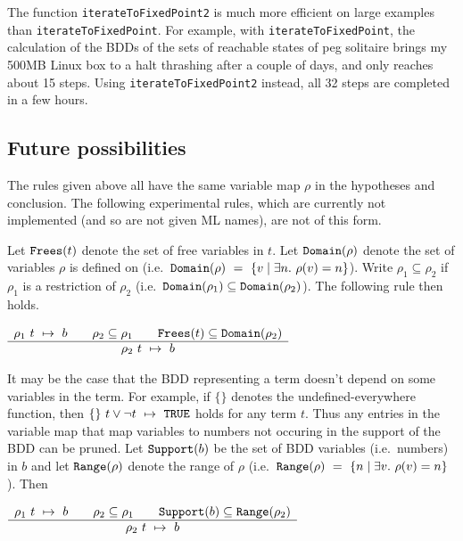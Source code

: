 \documentclass[12pt]{article}
\newcommand{\ml}[1]{{\tt #1}}
\newcommand{\termbdd}[3]{\mbox{$#1~#2~\mapsto~#3$}}
\begin{document}
The function \ml{iterateToFixedPoint2} is much more efficient on large
examples than \ml{iterateToFixedPoint}. For example, with
\ml{iterateToFixedPoint}, the calculation of the BDDs of the sets of
reachable states of peg solitaire brings my 500MB Linux box to a halt
thrashing after a couple of days, and only reaches about 15 steps.
Using \ml{iterateToFixedPoint2} instead, all 32 steps are completed in a few
hours.

\subsection{Future possibilities}\label{future}

The rules given above all have the same variable map $\rho$ in the
hypotheses and conclusion. The following experimental rules, which are currently
not implemented (and so are not given ML names), are not of this form.

Let $\ml{Frees}(t)$ denote the set of free variables in $t$.  
Let 
$\ml{Domain}(\rho)$ denote the set of variables $\rho$ is defined on
(i.e.~$\ml{Domain}(\rho)~=~\{v\mid \exists n.~\rho(v)=n\}$).
Write
$\rho_1\subseteq\rho_2$ if $\rho_1$ is a restriction of $\rho_2$
(i.e.~$\ml{Domain}(\rho_1)\subseteq\ml{Domain}(\rho_2)$).  
The following rule then holds.

\smallskip


$\begin{array}{c}
\termbdd{\rho_1}{t}{b} \qquad \rho_2\subseteq\rho_1 \qquad \ml{Frees}(t)\subseteq\ml{Domain}(\rho_2)
\\ \hline
\termbdd{\rho_2}{t}{b}
\end{array}$

\smallskip

It may be the case that the BDD representing a term doesn't depend on
some variables in the term. For example, if $\{\}$ denotes the
undefined-everywhere function, then $\termbdd{\{\}}{t\vee\neg
t}{\ml{TRUE}}$ holds for any term $t$. Thus any entries in the
variable map that map variables to numbers not occuring in the support
of the BDD can be pruned.  Let $\ml{Support}(b)$ be the set of BDD
variables (i.e.~numbers) in $b$ and let $\ml{Range}(\rho)$ denote the
range of $\rho$ (i.e.~$\ml{Range}(\rho)~=~\{n\mid \exists
v.~\rho(v)=n\}$). Then

\smallskip

$\begin{array}{c}
\termbdd{\rho_1}{t}{b} \qquad \rho_2\subseteq\rho_1 \qquad \ml{Support}(b)\subseteq\ml{Range}(\rho_2)
\\ \hline
\termbdd{\rho_2}{t}{b}
\end{array}$
\end{document}

